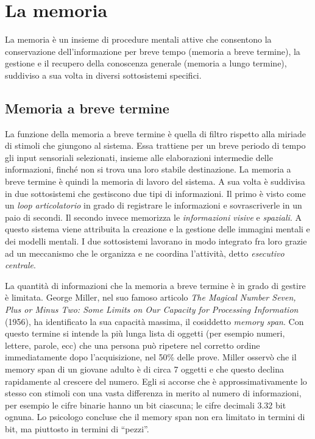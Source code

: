 \chapter{La memoria}
La memoria è un insieme di procedure mentali attive che consentono la conservazione dell’informazione per breve tempo (memoria a breve termine), la gestione e il recupero della conoscenza generale (memoria a lungo termine), suddiviso a sua volta in diversi sottosistemi specifici.

\section{Memoria a breve termine}
La funzione della memoria a breve termine è quella di filtro rispetto alla miriade di stimoli che giungono al sistema. Essa trattiene per un breve periodo di tempo gli input sensoriali selezionati, insieme alle elaborazioni intermedie delle informazioni, finché non si trova una loro stabile destinazione. La memoria a breve termine è quindi la memoria di lavoro del sistema. A sua volta è suddivisa in due sottosistemi che gestiscono due tipi di informazioni. Il primo è visto come un \emph{loop articolatorio} in grado di registrare le informazioni e sovrascriverle in un paio di secondi. Il secondo invece memorizza le \emph{informazioni visive} e \emph{spaziali}. A questo sistema viene attribuita la creazione e la gestione delle immagini mentali e dei modelli mentali. I due sottosistemi lavorano in modo integrato fra loro grazie ad un meccanismo che le organizza e ne coordina l’attività, detto \emph{esecutivo centrale}.

La quantità di informazioni che la memoria a breve termine è in grado di gestire è limitata. George Miller, nel suo famoso articolo \emph{The Magical Number Seven, Plus or Minus Two: Some Limits on Our Capacity for Processing Information} (1956), ha identificato la sua capacità massima, il cosiddetto \emph{memory span}. Con questo termine si intende la più lunga lista di oggetti (per esempio numeri, lettere, parole, ecc) che una persona può ripetere nel corretto ordine immediatamente dopo l'acquisizione, nel 50\% delle prove. Miller osservò che il memory span di un giovane adulto è di circa 7 oggetti e che questo declina rapidamente al crescere del numero. Egli si accorse che è approssimativamente lo stesso con stimoli con una vasta differenza in merito al numero di informazioni, per esempio le cifre binarie hanno un bit ciascuna; le cifre decimali 3.32 bit ognuna. Lo psicologo concluse che il memory span non era limitato in termini di bit, ma piuttosto in termini di ``pezzi''.

